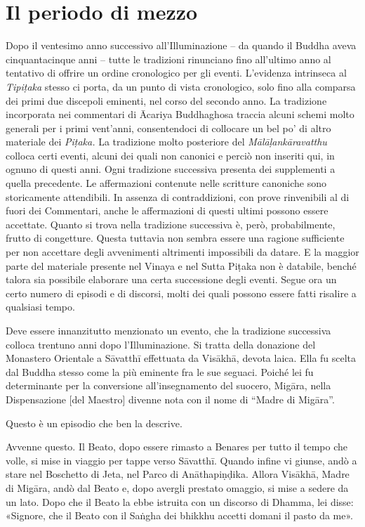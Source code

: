 \chapter{Il periodo di mezzo}

 Dopo il ventesimo anno successivo all’Illuminazione –
da quando il Buddha aveva cinquantacinque anni – tutte le tradizioni
rinunciano fino all’ultimo anno al tentativo di offrire un ordine
cronologico per gli eventi. L’evidenza intrinseca al \emph{Tipiṭaka} stesso
ci porta, da un punto di vista cronologico, solo fino alla comparsa dei
primi due discepoli eminenti, nel corso del secondo anno. La tradizione
incorporata nei commentari di Ācariya Buddhaghosa traccia alcuni schemi
molto generali per i primi vent’anni, consentendoci di collocare un bel
po’ di altro materiale dei \emph{Piṭaka.} La tradizione molto posteriore del
\emph{Mālāḷankāravatthu} colloca certi eventi, alcuni dei quali non canonici
e perciò non inseriti qui, in ognuno di questi anni. Ogni tradizione
successiva presenta dei supplementi a quella precedente. Le affermazioni
contenute nelle scritture canoniche sono storicamente attendibili. In
assenza di contraddizioni, con prove rinvenibili al di fuori dei
Commentari, anche le affermazioni di questi ultimi possono essere
accettate. Quanto si trova nella tradizione successiva è, però,
probabilmente, frutto di congetture. Questa tuttavia non sembra essere
una ragione sufficiente per non accettare degli avvenimenti altrimenti
impossibili da datare. E la maggior parte del materiale presente nel
Vinaya e nel Sutta Piṭaka non è databile, benché talora sia possibile
elaborare una certa successione degli eventi. Segue ora un certo numero
di episodi e di discorsi, molti dei quali possono essere fatti risalire
a qualsiasi tempo.


 Deve essere innanzitutto menzionato un evento, che la
tradizione successiva colloca trentuno anni dopo l’Illuminazione. Si
tratta della donazione del Monastero Orientale a Sāvatthī effettuata da
Visākhā, devota laica. Ella fu scelta dal Buddha stesso come la più
eminente fra le sue seguaci. Poiché lei fu determinante per la
conversione all’insegnamento del suocero, Migāra, nella Dispensazione
[del Maestro] divenne nota con il nome di “Madre di Migāra”.


 Questo è un episodio che ben la descrive.


 Avvenne questo. Il Beato, dopo essere rimasto a Benares
per tutto il tempo che volle, si mise in viaggio per tappe verso
Sāvatthī. Quando infine vi giunse, andò a stare nel Boschetto di Jeta,
nel Parco di Anāthapiṇḍika. Allora Visākhā, Madre di Migāra, andò dal
Beato e, dopo avergli prestato omaggio, si mise a sedere da un lato.
Dopo che il Beato la ebbe istruita con un discorso di Dhamma, lei disse:
«Signore, che il Beato con il Saṅgha dei bhikkhu accetti domani il pasto
da me».


